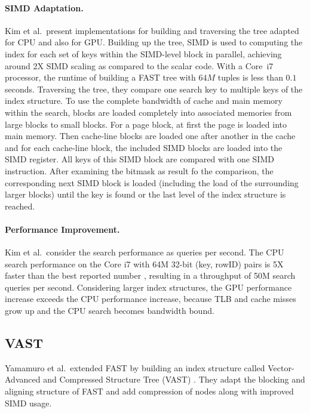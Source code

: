 \documentclass[runningheads,a4paper]{llncs}
\begin{document}
\paragraph{SIMD Adaptation.}
Kim et al.\ present implementations for building and traversing the tree adapted for CPU and also for GPU. Building up the tree, SIMD is used to computing the index for each set of keys within the SIMD-level block in parallel, achieving around 2X SIMD scaling as compared to the scalar code. With a Core~i7 processor, the runtime of building a FAST tree with $64M$ tuples is less than $0.1$ seconds. Traversing the tree, they compare one search key to multiple keys of the index structure. To use the complete bandwidth of cache and main memory within the search, blocks are loaded completely into associated memories from large blocks to small blocks. For a page block, at first the page is loaded into main memory. Then cache-line blocks are loaded one after another in the cache and for each cache-line block, the included SIMD blocks are loaded into the SIMD register. All keys of this SIMD block are compared with one SIMD instruction. After examining the bitmask as result fo the comparison, the corresponding next SIMD block is loaded (including the load of the surrounding larger blocks) until the key is found or the last level of the index structure is reached.


\paragraph{Performance Improvement.}
Kim et al.\ consider the search performance as queries per second. The CPU search performance on the Core i7 with 64M 32-bit (key, rowID) pairs is 5X faster than the best reported number \cite{schlegel2009k}, resulting in a throughput of 50M search queries per second. Considering larger index structures, the GPU performance increase exceeds the CPU performance increase, because TLB and cache misses grow up and the CPU search becomes bandwidth bound.

\subsection{VAST}\label{SCM}
Yamamuro et al.\ extended FAST by building an index structure called Vector-Advanced and Compressed Structure Tree (VAST) \cite{yamamuro2012vast}. They adapt the blocking and aligning structure of FAST and add compression of nodes along with improved SIMD usage. %
\end{document}
